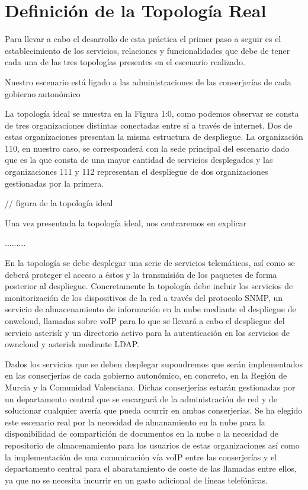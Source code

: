 \documentclass[a4paper]{article}
\begin{document}

\thispagestyle{empty}
\tableofcontents
\newpage


\section{Definición de la Topología Real}

Para llevar a cabo el desarrollo de esta práctica el primer paso a seguir es el establecimiento de los servicios, relaciones y funcionalidades que debe de tener cada una de las tres topologías presentes en el escenario realizado. 

\noindent Nuestro escenario está ligado a las administraciones de las conserjerías de cada gobierno autonómico

\medskip
\noindent La topología ideal se muestra en la Figura 1:0, como podemos observar se consta de tres organizaciones distintas conectadas entre sí a través de internet. Dos de estas organizaciones presentan la misma estructura de despliegue. La organización 110, en nuestro caso, se corresponderá con la sede principal del escenario dado que es la que consta de una
mayor cantidad de servicios desplegados y las organizaciones 111 y 112 representan el despliegue de dos organizaciones gestionadas por la primera.

   
// figura de la topología ideal 

\medskip 
\noindent Una vez presentada la topología ideal, nos centraremos en explicar 

.........

\noindent En la topología se debe desplegar una serie de servicios telemáticos, así como se deberá proteger el acceso a éstos y la transmisión de los paquetes de forma posterior al despliegue.  Concretamente la topología debe incluir los servicios de monitorización de los dispositivos de la red a través del protocolo SNMP, un servicio de almacenamiento de información en la nube mediante el despliegue de onwcloud, llamadas sobre voIP para
lo que se llevará a cabo el despliegue del servicio asterisk y un directorio activo para la autenticación en los servicios de owncloud y asterisk mediante LDAP.

\medskip
\noindent Dados los servicios que se deben desplegar supondremos que serán implementados en las conserjerías de cada gobierno autonómico, en concreto, en la Región de Murcia y la Comunidad Valenciana. Dichas conserjerías estarán gestionadas por un departamento central que se encargará de la administración de red y de solucionar cualquier avería que pueda ocurrir en ambas conserjerías. Se ha elegido este escenario real por la necesidad de almanamiento en la nube para la disponibilidad de compartición de documentos en la nube o la necesidad de repositorio de almacenamiento para los usuarios de estas organizaciones así como la implementación de una comunicación vía voIP entre las conserjerías y el departamento central para el abaratamiento de coste de las llamadas entre ellos, ya que no se necesita
incurrir en un gasto adicional de líneas telefónicas.
\end{document}
